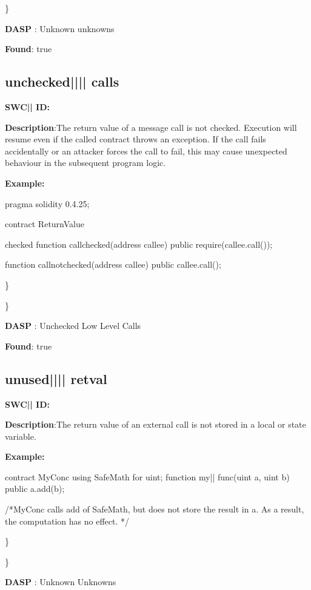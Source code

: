 \documentclass{article}
\begin{document}
\} 

\textbf{DASP} : Unknown unknowns

\textbf{Found}: true

\subsection{unchecked{||\textunderscore|| }calls} 
\textbf{SWC{|\textunderscore| }ID:} 

\textbf{Description}:The return value of a message call is not checked. Execution will resume even if the called contract throws an exception. If the call fails accidentally or an attacker forces the call to fail, this may cause unexpected behaviour in the subsequent program logic.


\textbf{Example:} 
\begin{ffcode} 

pragma solidity 0.4.25;

contract ReturnValue {

checked
function callchecked(address callee) public {
    require(callee.call());
  }

  function callnotchecked(address callee) public {
    callee.call();
  }
}

\end{ffcode} 
\} 

\} 

\textbf{DASP} : Unchecked Low Level Calls

\textbf{Found}: true

\subsection{unused{||\textunderscore|| }retval} 
\textbf{SWC{|\textunderscore| }ID:} 

\textbf{Description}:The return value of an external call is not stored in a local or state variable.


\textbf{Example:} 
\begin{ffcode} 

contract MyConc{
    using SafeMath for uint;
    function my|\textunderscore| func(uint a, uint b) public{
        a.add(b);
    }
}

 /*MyConc calls add of SafeMath, but does not store the result in a. As a result, the computation has no effect. */ 

\end{ffcode} 
\} 

\} 

\textbf{DASP} : Unknown Unknowns
\end{document}
